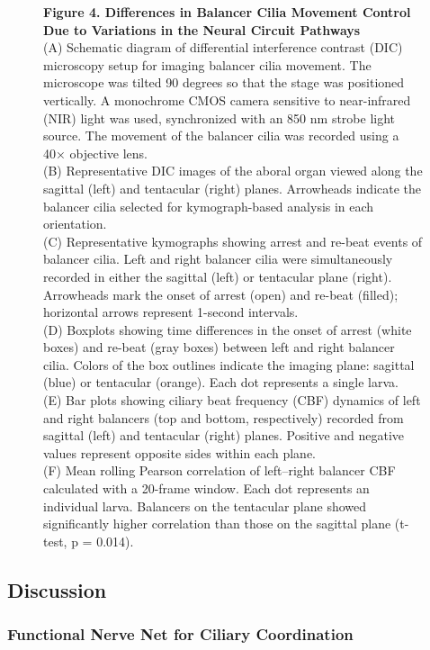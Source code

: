 \documentclass[
  11pt,
]{article}
\begin{document}
\begin{figure}[H]
\caption{\textbf{Figure 4. Differences in Balancer Cilia Movement
Control Due to Variations in the Neural Circuit Pathways}\\
(A) Schematic diagram of differential interference contrast (DIC)
microscopy setup for imaging balancer cilia movement. The microscope was
tilted 90 degrees so that the stage was positioned vertically. A
monochrome CMOS camera sensitive to near-infrared (NIR) light was used,
synchronized with an 850 nm strobe light source. The movement of the
balancer cilia was recorded using a 40× objective lens.\\
(B) Representative DIC images of the aboral organ viewed along the
sagittal (left) and tentacular (right) planes. Arrowheads indicate the
balancer cilia selected for kymograph-based analysis in each
orientation.\\
(C) Representative kymographs showing arrest and re-beat events of
balancer cilia. Left and right balancer cilia were simultaneously
recorded in either the sagittal (left) or tentacular plane (right).
Arrowheads mark the onset of arrest (open) and re-beat (filled);
horizontal arrows represent 1-second intervals.\\
(D) Boxplots showing time differences in the onset of arrest (white
boxes) and re-beat (gray boxes) between left and right balancer cilia.
Colors of the box outlines indicate the imaging plane: sagittal (blue)
or tentacular (orange). Each dot represents a single larva.\\
(E) Bar plots showing ciliary beat frequency (CBF) dynamics of left and
right balancers (top and bottom, respectively) recorded from sagittal
(left) and tentacular (right) planes. Positive and negative values
represent opposite sides within each plane.\\
(F) Mean rolling Pearson correlation of left--right balancer CBF
calculated with a 20-frame window. Each dot represents an individual
larva. Balancers on the tentacular plane showed significantly higher
correlation than those on the sagittal plane (t-test, p = 0.014).}

\end{figure}%

\subsection{Discussion}\label{discussion}

\subsubsection{Functional Nerve Net for Ciliary
Coordination}\label{functional-nerve-net-for-ciliary-coordination}
\end{document}
